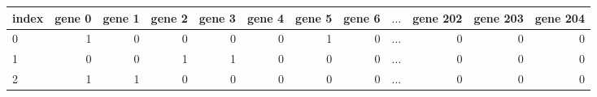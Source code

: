 \begin{tabular}{lrrrrrrrrrrr}
\toprule
index &  gene 0 &  gene 1 &  gene 2 &  gene 3 &  gene 4 &  gene 5 &  gene 6 &  \(\dots\) &   gene 202 &  gene 203 &  gene 204 \\
\midrule
0     &       1 &       0 &       0 &       0 &       0 &       1 &       0 &  \(\dots\) &         0 &         0 &         0 \\
1     &       0 &       0 &       1 &       1 &       0 &       0 &       0 &  \(\dots\) &         0 &         0 &         0 \\
2     &       1 &       1 &       0 &       0 &       0 &       0 &       0 &  \(\dots\) &         0 &         0 &         0 \\
\bottomrule
\end{tabular}
